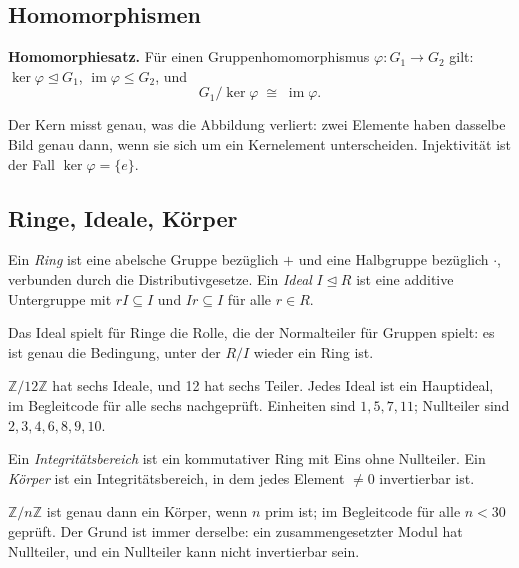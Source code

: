 \documentclass[12pt, a4paper]{article}
\begin{document}
\subsection{Homomorphismen}

\begin{definitionbox}
\textbf{Homomorphiesatz.} Für einen Gruppenhomomorphismus
$\varphi: G_1 \to G_2$ gilt: $\ker \varphi \trianglelefteq G_1$,
$\operatorname{im} \varphi \leq G_2$, und
\[
  G_1 / \ker \varphi \;\cong\; \operatorname{im} \varphi .
\]
\end{definitionbox}

Der Kern misst genau, was die Abbildung verliert: zwei Elemente haben dasselbe
Bild genau dann, wenn sie sich um ein Kernelement unterscheiden. Injektivität
ist der Fall $\ker \varphi = \{e\}$.

\subsection{Ringe, Ideale, Körper}

\begin{definitionbox}
Ein \emph{Ring} ist eine abelsche Gruppe bezüglich $+$ und eine Halbgruppe
bezüglich $\cdot$, verbunden durch die Distributivgesetze. Ein \emph{Ideal}
$I \trianglelefteq R$ ist eine additive Untergruppe mit $rI \subseteq I$ und
$Ir \subseteq I$ für alle $r \in R$.
\end{definitionbox}

Das Ideal spielt für Ringe die Rolle, die der Normalteiler für Gruppen
spielt: es ist genau die Bedingung, unter der $R/I$ wieder ein Ring ist.

\begin{examplebox}
$\mathbb{Z}/12\mathbb{Z}$ hat sechs Ideale, und 12 hat sechs Teiler. Jedes
Ideal ist ein Hauptideal, im Begleitcode für alle sechs nachgeprüft.
Einheiten sind $1, 5, 7, 11$; Nullteiler sind $2, 3, 4, 6, 8, 9, 10$.
\end{examplebox}

\begin{definitionbox}
Ein \emph{Integritätsbereich} ist ein kommutativer Ring mit Eins ohne
Nullteiler. Ein \emph{Körper} ist ein Integritätsbereich, in dem jedes
Element $\neq 0$ invertierbar ist.
\end{definitionbox}

$\mathbb{Z}/n\mathbb{Z}$ ist genau dann ein Körper, wenn $n$ prim ist; im
Begleitcode für alle $n < 30$ geprüft. Der Grund ist immer derselbe: ein
zusammengesetzter Modul hat Nullteiler, und ein Nullteiler kann nicht
invertierbar sein.
\end{document}
